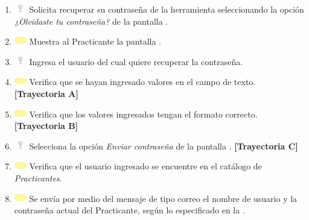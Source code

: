 \begin{enumerate}
	\item \includegraphics[width=15pt, height=10pt]{./Figuras/iconosCU/usuario.png} Solicita recuperar su contraseña de la herramienta seleccionando la opción \textit{¿Olvidaste tu contraseña?} de la pantalla . 
	\item \includegraphics[width=15pt]{./Figuras/iconosCU/herramienta.png} Muestra al Practicante la pantalla .
	\item \includegraphics[width=15pt, height=10pt]{./Figuras/iconosCU/usuario.png} Ingresa el usuario del cual quiere recuperar la contraseña.
	\item \includegraphics[width=15pt]{./Figuras/iconosCU/herramienta.png} Verifica que se hayan ingresado valores en el campo de texto. \textbf{[Trayectoria A]} 
	\item \includegraphics[width=15pt]{./Figuras/iconosCU/herramienta.png} Verifica que los valores ingresados tengan el formato correcto. \textbf{[Trayectoria B]} 
	\item \includegraphics[width=15pt, height=10pt]{./Figuras/iconosCU/usuario.png} Selecciona la opción \textit{Enviar contraseña} de la pantalla . \textbf{[Trayectoria C]}
	\item \includegraphics[width=15pt]{./Figuras/iconosCU/herramienta.png} Verifica que el usuario ingresado se encuentre en el catálogo de \textit{Practicantes}.
	\item \includegraphics[width=15pt]{./Figuras/iconosCU/herramienta.png} Se envía por medio del mensaje de tipo correo  el nombre de usuario y la contraseña actual del Practicante, según lo especificado en la .

\end{enumerate}
